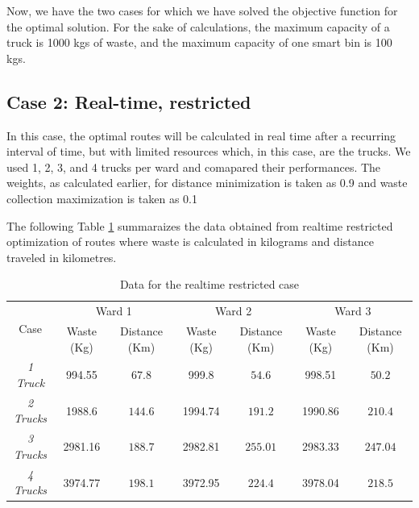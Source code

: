 \documentclass[12pt]{article}
\begin{document}
Now, we have the two cases for which we have solved the objective function for the optimal solution. For the sake of calculations, the maximum capacity of a truck is 1000 kgs of waste, and the maximum capacity of one smart bin is 100 kgs.

\subsection*{Case 2: Real-time, restricted}
In this case, the optimal routes will be calculated in real time after a recurring interval of time, but with limited resources which, in this case, are the trucks. We used 1, 2, 3, and 4 trucks per ward and comapared their performances. The weights, as calculated earlier, for distance minimization is taken as 0.9 and waste collection maximization is taken as 0.1

The following Table \ref{tab1} summaraizes the data obtained from realtime restricted optimization of routes where waste is calculated in kilograms and distance traveled in kilometres.
\begin{table}[H]
    \centering
    \caption{Data for the realtime restricted case} \label{tab1}
    \vspace*{0.3cm}
    \begin{tabular}{|c|c|c|c|c|c|c|}
        \hline \multirow{2}{*}{Case} & \multicolumn{2}{c|}{Ward 1} & \multicolumn{2}{c|}{Ward 2} & \multicolumn{2}{c|}{Ward 3}\\
        \cline{2-7}& Waste (Kg)  & Distance (Km) & Waste (Kg) & Distance (Km) & Waste (Kg) & Distance (Km)\\ 
        \hline \textit{1 Truck} & 994.55 & $67.8$ & 999.8 & $54.6$ & 998.51 & $50.2$ \\
        \hline \textit{2 Trucks} & 1988.6 & $144.6$ & 1994.74 & $191.2$ & 1990.86 & $210.4$ \\
        \hline \textit{3 Trucks} & 2981.16 & $188.7$ & 2982.81 & $255.01$ & 2983.33 & $247.04$ \\
        \hline \textit{4 Trucks} & 3974.77 & $198.1$ & 3972.95 & $224.4$ & 3978.04 & $218.5$ \\
        \hline
    \end{tabular}
\end{table}
\end{document}
